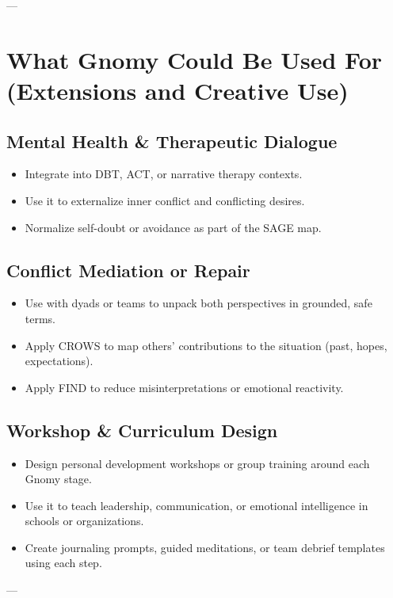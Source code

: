 \documentclass{article}
\begin{document}
---

\section{What Gnomy Could Be Used For (Extensions and Creative Use)}

\subsection{Mental Health \& Therapeutic Dialogue}
\begin{itemize}[noitemsep,topsep=0pt]
    \item Integrate into DBT, ACT, or narrative therapy contexts.
    \item Use it to externalize inner conflict and conflicting desires.
    \item Normalize self-doubt or avoidance as part of the SAGE map.
\end{itemize}

\subsection{Conflict Mediation or Repair}
\begin{itemize}[noitemsep,topsep=0pt]
    \item Use with dyads or teams to unpack both perspectives in grounded, safe terms.
    \item Apply CROWS to map others' contributions to the situation (past, hopes, expectations).
    \item Apply FIND to reduce misinterpretations or emotional reactivity.
\end{itemize}

\subsection{Workshop \& Curriculum Design}
\begin{itemize}[noitemsep,topsep=0pt]
    \item Design personal development workshops or group training around each Gnomy stage.
    \item Use it to teach leadership, communication, or emotional intelligence in schools or organizations.
    \item Create journaling prompts, guided meditations, or team debrief templates using each step.
\end{itemize}

---
\end{document}
